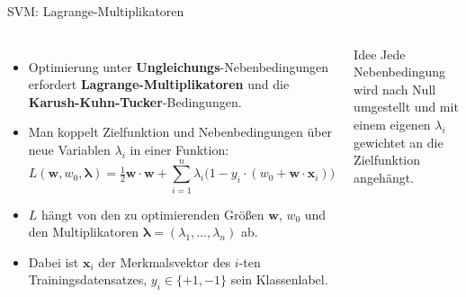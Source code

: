 \begin{frame}{SVM: Lagrange-Multiplikatoren}
\begin{columns}

\footnotesize
\begin{itemize}
  \item Optimierung unter \textbf{Ungleichungs}-Nebenbedingungen erfordert
        \textbf{Lagrange-Multiplikatoren} und die
        \textbf{Karush-Kuhn-Tucker}-Bedingungen.
  \item Man koppelt Zielfunktion und Nebenbedingungen über neue Variablen
        $\lambda_i$ in einer Funktion:
        \[
          L(\mathbf{w}, w_0, \boldsymbol{\lambda}) =
          \tfrac{1}{2}\mathbf{w}\cdot\mathbf{w}
          + \sum_{i=1}^{n} \lambda_i\bigl(1 - y_i \cdot (w_0 + \mathbf{w}\cdot\mathbf{x}_{i})\bigr)
        \]
  \item $L$ hängt von den zu optimierenden Größen \textbf{$\mathbf{w}$},
        \textbf{$w_0$} und den Multiplikatoren
        \textbf{$\boldsymbol{\lambda} = (\lambda_1, \dots, \lambda_n)$} ab.
  \item Dabei ist $\mathbf{x}_{i}$ der Merkmalsvektor des $i$-ten
        Trainingsdatensatzes, $y_i \in \{+1, -1\}$ sein Klassenlabel.
\end{itemize}

\begin{blockC1}{\footnotesize Idee}
\footnotesize
Jede Nebenbedingung wird nach Null umgestellt und mit einem eigenen
$\lambda_i$ gewichtet an die Zielfunktion angehängt.
\end{blockC1}
\end{columns}
\end{frame}


